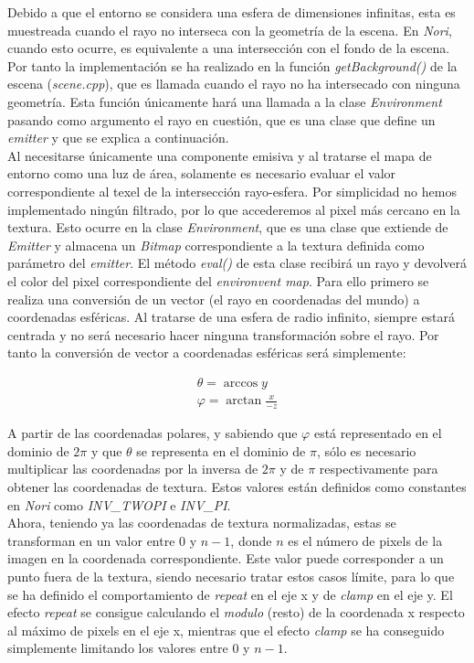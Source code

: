 \documentclass[10pt,oneside,a4paper]{article}
\begin{document}
Debido a que el entorno se considera una esfera de dimensiones infinitas, esta es muestreada cuando el rayo no interseca con la geometría de la escena. En \emph{Nori}, cuando esto ocurre, es equivalente a una intersección con el fondo de la escena. Por tanto la implementación se ha realizado en la función \emph{getBackground()} de la escena (\emph{scene.cpp}), que es llamada cuando el rayo no ha intersecado con ninguna geometría. Esta función únicamente hará una llamada a la clase \emph{Environment} pasando como argumento el rayo en cuestión, que es una clase que define un \emph{emitter} y que se explica a continuación.\\

Al necesitarse únicamente una componente emisiva y al tratarse el mapa de entorno como una luz de área, solamente es necesario evaluar el valor correspondiente al texel de la intersección rayo-esfera. Por simplicidad no hemos implementado ningún filtrado, por lo que accederemos al pixel más cercano en la textura. Esto ocurre en la clase \emph{Environment}, que es una clase que extiende de \emph{Emitter} y almacena un \emph{Bitmap} correspondiente a la textura definida como parámetro del \emph{emitter}. El método \emph{eval()} de esta clase recibirá un rayo y devolverá el color del pixel correspondiente del \emph{environvent map}. Para ello primero se realiza una conversión de un vector (el rayo en coordenadas del mundo) a coordenadas esféricas. Al tratarse de una esfera de radio infinito, siempre estará centrada y no será necesario hacer ninguna transformación sobre el rayo. Por tanto la conversión de vector a coordenadas esféricas será simplemente:

\begin{gather}
\theta = \arccos{y}\\
\varphi =  \arctan{\frac{x}{-z}}
\end{gather}

A partir de las coordenadas polares, y sabiendo que $\varphi$ está representado en el dominio de $2\pi$ y que $\theta$ se representa en el dominio de $\pi$, sólo es necesario multiplicar las coordenadas por la inversa de $2\pi$ y de $\pi$ respectivamente para obtener las coordenadas de textura. Estos valores están definidos como constantes en \emph{Nori} como \emph{INV\_TWOPI} e \emph{INV\_PI}.\\

Ahora, teniendo ya las coordenadas de textura normalizadas, estas se transforman en un valor entre $0$ y $n-1$, donde $n$ es el número de pixels de la imagen en la coordenada correspondiente. Este valor puede corresponder a un punto fuera de la textura, siendo necesario tratar estos casos límite, para lo que se ha definido el comportamiento de \emph{repeat} en el eje x y de \emph{clamp} en el eje y. El efecto \emph{repeat} se consigue calculando el \emph{modulo} (resto) de la coordenada x respecto al máximo de pixels en el eje x, mientras que el efecto \emph{clamp} se ha conseguido simplemente limitando los valores entre $0$ y $n-1$.\\
\end{document}
